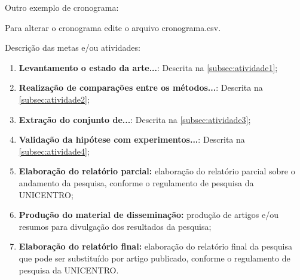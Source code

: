 Outro exemplo de cronograma:

Para alterar o cronograma edite o arquivo cronograma.csv.




Descrição das metas e/ou atividades:
\begin{enumerate}
    \item \textbf{Levantamento o estado da arte...}: Descrita na \autoref{subsec:atividade1};
    \item \textbf{Realização de comparações entre os métodos...}: Descrita na \autoref{subsec:atividade2};
    \item \textbf{Extração do conjunto de...}: Descrita na \autoref{subsec:atividade3};    
    \item \textbf{Validação da hipótese com experimentos...}: Descrita na \autoref{subsec:atividade4};
    \item \textbf{Elaboração do relatório parcial:} elaboração do relatório parcial sobre o andamento da pesquisa, conforme o regulamento de pesquisa da UNICENTRO;
    \item \textbf{Produção do material de disseminação:} produção de artigos e/ou resumos para divulgação dos resultados da pesquisa;
    \item \textbf{Elaboração do relatório final:} elaboração do relatório final da pesquisa que pode ser substituído por artigo publicado, conforme o regulamento de pesquisa da UNICENTRO.
\end{enumerate}